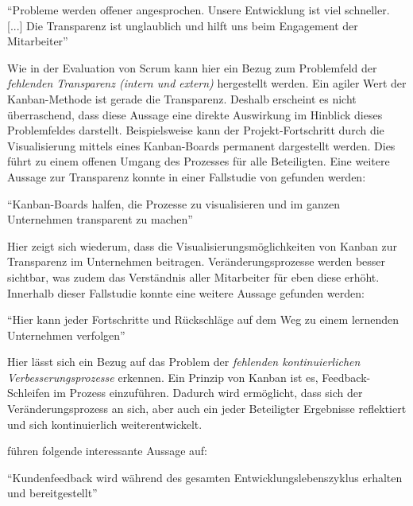 \begin{center}
	``Probleme werden offener angesprochen. Unsere Entwicklung ist viel schneller. [...] Die Transparenz ist unglaublich und hilft uns beim Engagement der Mitarbeiter'' \cite[S. 5]{fuchs_adapting_2019}
\end{center}

Wie in der Evaluation von Scrum kann hier ein Bezug zum Problemfeld der \textit{fehlenden Transparenz (intern und extern)} hergestellt werden. Ein agiler Wert der Kanban-Methode ist gerade die Transparenz. Deshalb erscheint es nicht überraschend, dass diese Aussage eine direkte Auswirkung im Hinblick dieses Problemfeldes darstellt. Beispielsweise kann der Projekt-Fortschritt durch die Visualisierung mittels eines Kanban-Boards permanent dargestellt werden. Dies führt zu einem offenen Umgang des Prozesses für alle Beteiligten. Eine weitere Aussage zur Transparenz konnte in einer Fallstudie von  gefunden werden:

\begin{center}
	``Kanban-Boards halfen, die Prozesse zu visualisieren und im ganzen Unternehmen transparent zu machen'' \cite[S. 213]{hofert_agile_2018}
\end{center}

Hier zeigt sich wiederum, dass die Visualisierungsmöglichkeiten von Kanban zur Transparenz im Unternehmen beitragen. Veränderungsprozesse werden besser sichtbar, was zudem das Verständnis aller Mitarbeiter für eben diese erhöht. Innerhalb dieser Fallstudie konnte eine weitere Aussage gefunden werden:

\begin{center}
	``Hier kann jeder Fortschritte und Rückschläge auf dem Weg zu einem lernenden Unternehmen verfolgen'' \cite[S. 212]{fuchs_adapting_2019}
\end{center}

Hier lässt sich ein Bezug auf das Problem der \textit{fehlenden kontinuierlichen Verbesserungsprozesse} erkennen. Ein Prinzip von Kanban ist es, Feedback-Schleifen im Prozess einzuführen. Dadurch wird ermöglicht, dass sich der Veränderungsprozess an sich, aber auch ein jeder Beteiligter Ergebnisse reflektiert und sich kontinuierlich weiterentwickelt. 

 führen folgende interessante Aussage auf:

\begin{center}
	``Kundenfeedback wird während des gesamten Entwicklungslebenszyklus erhalten und bereitgestellt'' \cite[S. 7]{rodriguez_combining_2014}
\end{center}

